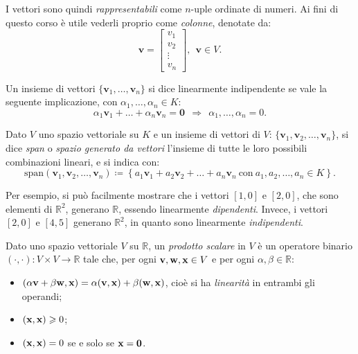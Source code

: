 I vettori sono quindi \textit{rappresentabili} come $n$-uple ordinate di numeri. Ai fini di questo corso è utile vederli proprio come \textit{colonne}, denotate da:
\begin{equation*}
\mathbf{v} =\begin{bmatrix}
v_{1}\\
v_{2}\\
\vdots \\
v_{n}
\end{bmatrix} ,\ \ \mathbf{v} \in V.
\end{equation*}
\begin{definition}
	Un insieme di vettori $\{\mathbf{v}_{1} ,\dotsc ,\mathbf{v}_{n}\}$ si dice linearmente indipendente se vale la seguente implicazione, con $\alpha _{1} ,\dotsc ,\alpha _{n} \in K$:
	\begin{equation*}
		\alpha _{1}\mathbf{v}_{1} +\dotsc +\alpha _{n}\mathbf{v}_{n} =\mathbf{0} \ \ \Rightarrow \ \ \alpha _{1} ,\dotsc ,\alpha _{n} =0.
	\end{equation*}
\end{definition}
\begin{definition}
[Span]
Dato $V$ uno spazio vettoriale su $K$ e un insieme di vettori di $V$: $\{\mathbf{v}_{1} ,\mathbf{v}_{2} ,\dotsc ,\mathbf{v}_{n}\}$, si dice \textit{span} o \textit{spazio generato da vettori} l'insieme di tutte le loro possibili combinazioni lineari, e si indica con:
\begin{equation*}
\text{span}(\mathbf{v}_{1} ,\mathbf{v}_{2} ,\dotsc ,\mathbf{v}_{n}) \coloneqq \left\{a_{1}\mathbf{v}_{1} +a_{2}\mathbf{v}_{2} +\dotsc +a_{n}\mathbf{v}_{n} \ \text{con} \ a_{1} ,a_{2} ,\dotsc ,a_{n} \in K\right\} .
\end{equation*}
\end{definition}
Per esempio, si può facilmente mostrare che i vettori $[1,0]$ e $[2,0]$, che sono elementi di $\mathbb{R}^{2}$, generano $\mathbb{R}$, essendo linearmente \textit{dipendenti}. Invece, i vettori $[2,0]$ e $[4,5]$ generano $\mathbb{R}^{2}$, in quanto sono linearmente \textit{indipendenti}.
\begin{definition}
	Dato uno spazio vettoriale $V$ su $\mathbb{R}$, un \textit{prodotto scalare} in $V$ è un operatore binario $( \cdot ,\cdot ) :V\times V\rightarrow \mathbb{R} $ tale che, per ogni $\mathbf{v} ,\mathbf{w} ,\mathbf{x} \in V$ e per ogni $\alpha ,\beta \in \mathbb{R} $:
\begin{itemize}
	\item $( \alpha \mathbf{v} +\beta \mathbf{w} ,\mathbf{x}) =\alpha (\mathbf{v} ,\mathbf{x}) +\beta (\mathbf{w} ,\mathbf{x})$, cioè si ha \textit{linearità} in entrambi gli operandi;
	\item $(\mathbf{x} ,\mathbf{x}) \geqslant 0$;
	\item $(\mathbf{x} ,\mathbf{x}) =0$ se e solo se $\mathbf{x} =\mathbf{0}$.
\end{itemize}
\end{definition}
